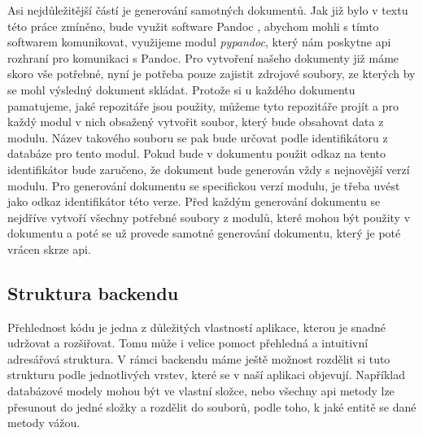 Asi nejdůležitější částí je generování samotných dokumentů. Jak již bylo v textu této práce zmíněno, bude využit software Pandoc \cite{pandocSW}, abychom mohli s tímto softwarem
komunikovat, využijeme modul \textit{pypandoc}, který nám poskytne \gls{api} rozhraní pro komunikaci s Pandoc. Pro vytvoření našeho dokumenty již máme skoro vše potřebné, nyní
je potřeba pouze zajistit zdrojové soubory, ze kterých by se mohl výsledný dokument skládat. Protože si u každého dokumentu pamatujeme, jaké repozitáře jsou použity, můžeme
tyto repozitáře projít a pro každý modul v nich obsažený vytvořit soubor, který bude obsahovat data z modulu. Název takového souboru se pak bude určovat podle identifikátoru
z databáze pro tento modul. Pokud bude v dokumentu použit odkaz na tento identifikátor bude zaručeno, že dokument bude generován vždy s nejnovější verzí modulu. Pro generování
dokumentu se specifickou verzí modulu, je třeba uvést jako odkaz identifikátor této verze. Před každým generování dokumentu se nejdříve vytvoří všechny potřebné soubory z modulů,
které mohou být použity v dokumentu a poté se už provede samotné generování dokumentu, který je poté vrácen skrze \gls{api}.

\clearpage

\subsection{Struktura backendu}

Přehlednost kódu je jedna z důležitých vlastností aplikace, kterou je snadné udržovat a rozšiřovat. Tomu může i velice pomoct přehledná a intuitivní adresářová struktura.
V rámci backendu máme ještě možnost rozdělit si tuto strukturu podle jednotlivých vrstev, které se v naší aplikaci objevují. Například databázové modely mohou být ve vlastní složce,
nebo všechny \gls{api} metody lze přesunout do jedné složky a rozdělit do souborů, podle toho, k jaké entitě se dané metody vážou.

\begin{listing}[H]
\end{listing}


